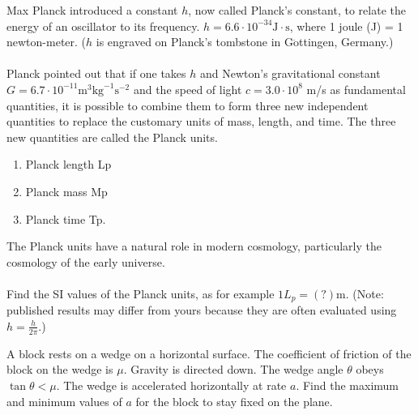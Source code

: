 \documentclass[12pt,letterpaper]{hmcpset}
\begin{document}
\begin{problem}[2.16]

  Max Planck introduced a constant $h$, now called Planck's constant, to relate the energy of an oscillator to its frequency. $h = 6.6 \cdot 10^{-34} \text{J} \cdot \text{s}$, where 1 joule (J) = 1 newton-meter. ($h$ is engraved on Planck's tombstone in G$\ddot{\text{o}}$ttingen, Germany.)
  \\\\
  Planck pointed out that if one takes $h$ and Newton's gravitational constant $G = 6.7 \cdot 10^{-11} \text{m}^3 \text{kg}^{-1} \text{s}^{-2}$ and the speed of light $c = 3.0 \cdot 10^8$ m/s as fundamental quantities, it is possible to combine them to form three new independent quantities to replace the customary units of mass, length, and time. The three new quantities are called the Planck units.
  \begin{enumerate}
    \item Planck length Lp
    \item Planck mass Mp
    \item Planck time Tp.
  \end{enumerate}
  The Planck units have a natural role in modern cosmology, particularly the cosmology of the early universe.
  \\\\
  Find the SI values of the Planck units, as for example $1L_p =(?)$m. (Note: published results may differ from yours because they are often evaluated using $h = \frac{h}{2\pi}$.)

\end{problem}

\begin{solution}
  \vfill
\end{solution}
\newpage

\begin{problem}[2.17]

  A block rests on a wedge on a horizontal surface. The coefficient of friction of the block on the wedge is $\mu$. Gravity is directed down. The wedge angle $\theta$ obeys $\tan \theta < \mu$. The wedge is accelerated horizontally at rate $a$. Find the maximum and minimum values of $a$ for the block to stay fixed on the plane.

\end{problem}

\begin{solution}
  \vfill
\end{solution}
\newpage
\end{document}
